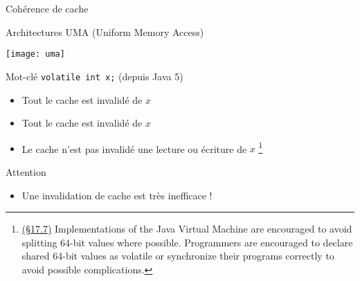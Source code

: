 
\begingroup

\begin{frame}[fragile]{Cohérence de cache}
  \begin{block}{Architectures UMA (Uniform Memory Access)}
    \begin{center}
      \texttt{[image: uma]}
    \end{center}
  \end{block}
  \begin{exampleblock}{Mot-clé \lstinline{volatile int x;} (depuis Java 5)}
    \begin{itemize}
    \item Tout le cache est invalidé   de $x$
    \item Tout le cache est invalidé  de $x$
    \item Le cache n'est pas invalidé  une lecture ou écriture de $x$ \footnote{
      \href{https://docs.oracle.com/javase/specs/jls/se7/html/jls-17.html\#jls-17.7}{(§17.7)}
      Implementations of the Java Virtual Machine are \alert{encouraged} to avoid splitting 64-bit values where possible.
      Programmers are \alert{encouraged} to declare shared 64-bit values as volatile or synchronize their programs correctly to avoid possible complications.
      }
    \end{itemize}
  \end{exampleblock}
  \begin{alertblock}{Attention}
    \begin{itemize}
    \item Une invalidation de cache est très inefficace !
    \end{itemize}
  \end{alertblock}

\end{frame}

\endgroup
\endinput
